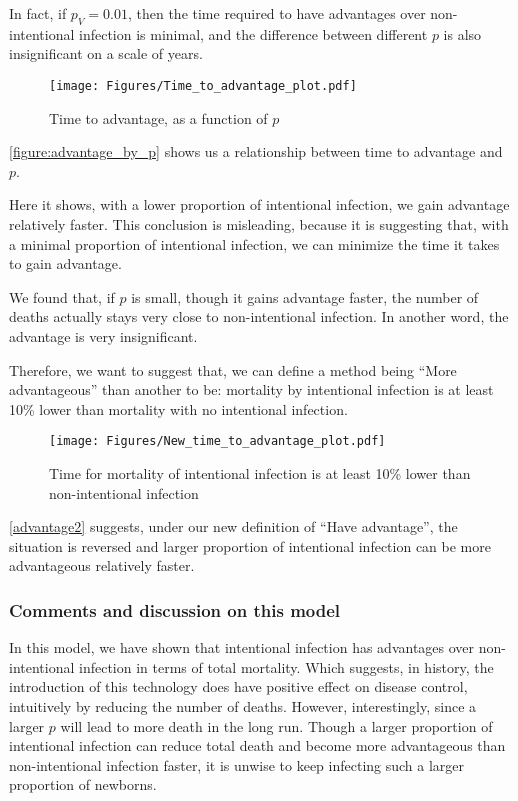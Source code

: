 \documentclass[12pt]{article}
\newcommand{\pmV}{p_{V}}
\begin{document}
In fact, if $\pmV=0.01$, then the time required to have advantages over non-intentional infection is minimal, and the difference between different $p$ is also insignificant on a scale of years.

\begin{figure}[H]
  \centering
  \texttt{[image: Figures/Time\_to\_advantage\_plot.pdf]}
  \caption{Time to advantage, as a function of $p$}
\label{figure:advantage_by_p}
\end{figure}

\autoref{figure:advantage_by_p} shows us a relationship between time to advantage and $p$.

Here it shows, with a lower proportion of intentional infection, we gain advantage relatively faster. This conclusion is misleading, because it is suggesting that, with a minimal proportion of intentional infection, we can minimize the time it takes to gain advantage.

We found that, if $p$ is small, though it gains advantage faster, the number of deaths actually stays very close to non-intentional infection. In another word, the advantage is very insignificant.

Therefore, we want to suggest that, we can define a method being ``More advantageous'' than another to be: mortality by intentional infection is at least 10\% lower than mortality with no intentional infection.

\begin{figure}[H]
  \caption{Time for mortality of intentional infection is at least 10\% lower than non-intentional infection}\label{advantage2}
  \centering
  \texttt{[image: Figures/New\_time\_to\_advantage\_plot.pdf]}
\end{figure}
\autoref{advantage2} suggests, under our new definition of ``Have advantage'', the situation is reversed and larger proportion of intentional infection can be more advantageous relatively faster.

\subsubsection{Comments and discussion on this model}

In this model, we have shown that intentional infection has advantages over non-intentional infection in terms of total mortality. Which suggests, in history, the introduction of this technology does have positive effect on disease control, intuitively by reducing the number of deaths. However, interestingly, since a larger $p$ will lead to more death in the long run. Though a larger proportion of intentional infection can reduce total death and become more advantageous than non-intentional infection faster, it is unwise to keep infecting such a larger proportion of newborns. 
\end{document}
